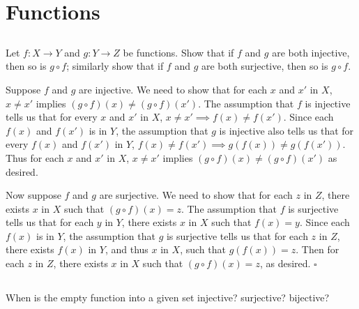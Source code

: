 \documentclass[../../main.tex]{subfiles}
\begin{document}
\ifmainfile
\else
    \maketitle
    \addtocounter{chapter}{3}
    \addtocounter{section}{2}
    \section{Functions}
\fi


\subsection{}
\begin{q}
    Let $f : X \to Y$ and $g : Y \to Z$ be functions. Show that if $f$ and $g$ are both injective, then so is $g \circ f$; similarly show that if $f$ and $g$ are both surjective, then so is $g \circ f$.
\end{q}


\begin{prf}
    Suppose $f$ and $g$ are injective.
    We need to show that for each $x$ and $x'$ in $X$, $x \neq x'$ implies $(g \circ f)(x) \neq (g \circ f)(x')$.
    The assumption that $f$ is injective tells us that for every $x$ and $x'$ in $X$, $x \neq x' \implies f(x) \neq f(x')$.
    Since each $f(x)$ and $f(x')$ is in $Y$, the assumption that $g$ is injective also tells us that for every $f(x)$ and $f(x')$ in $Y$, $f(x) \neq f(x') \implies g(f(x)) \neq g(f(x'))$.
    Thus for each $x$ and $x'$ in $X$, $x \neq x'$ implies $(g \circ f)(x) \neq (g \circ f)(x')$ as desired.
    
    Now suppose $f$ and $g$ are surjective.
    We need to show that for each $z$ in $Z$, there exists $x$ in $X$ such that $(g \circ f)(x)=z$.
    The assumption that $f$ is surjective tells us that for each $y$ in $Y$, there exists $x$ in $X$ such that $f(x)=y$.
    Since each $f(x)$ is in $Y$, the assumption that $g$ is surjective tells us that for each $z$ in $Z$, there exists $f(x)$ in $Y$, and thus $x$ in $X$, such that $g(f(x))=z$. Then for each $z$ in $Z$, there exists $x$ in $X$ such that $(g \circ f)(x)=z$, as desired. $\square$
\end{prf}

\subsection{}
\begin{q}
    When is the empty function into a given set injective? surjective? bijective?
\end{q}
\end{document}
